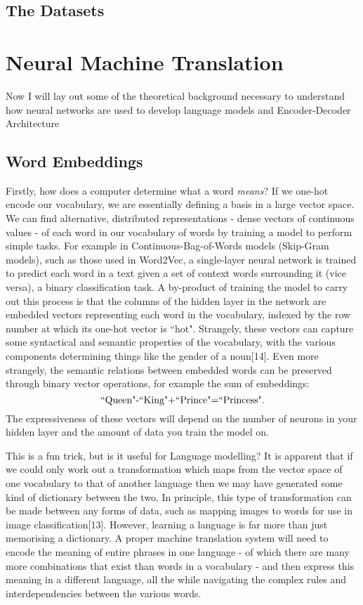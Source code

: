 \documentclass[]{article}
\begin{document}
\subsection{The Datasets} 
\section{Neural Machine Translation}
Now I will lay out some of the theoretical background necessary to understand how neural networks are used to develop language models and Encoder-Decoder Architecture 
\subsection{Word Embeddings}
Firstly, how does a computer determine what a word \textit{means}? If we one-hot encode our vocabulary, we are essentially defining a basis in a large vector space. We can find alternative, distributed representations - dense vectors of continuous values - of each word in our vocabulary of words by training a model to perform simple tasks. For example in Continuous-Bag-of-Words models (Skip-Gram models), such as those used in Word2Vec, a single-layer neural network is trained to predict each word in a text given a set of context words surrounding it (vice versa), a binary classification task.  A by-product of training the model to carry out this process is that the columns of the hidden layer in the network are embedded vectors representing each word in the vocabulary, indexed by the row number at which its one-hot vector is ``hot". Strangely, these vectors can capture some syntactical and semantic properties of the vocabulary, with the various components determining things like the gender of a noun[14]. Even more strangely, the semantic relations between embedded words can be preserved through binary vector operations, for example the sum of embeddings: \begin{equation}\textnormal{``Queen"-``King"+``Prince"=``Princess".}
\end{equation}
The expressiveness of these vectors will depend on the number of neurons in your hidden layer and the amount of data you train the model on.

This is a fun trick, but is it useful for Language modelling? It is apparent that if we could only work out a transformation which maps from the vector space of one vocabulary to that of another language then we may have generated some kind of dictionary between the two. In principle, this type of transformation can be made between any forms of data, such as mapping images to words for use in image classification[13]. However, learning a language is far more than just memorising a dictionary. A proper machine translation system will need to encode the meaning of entire phrases in one language - of which there are many more combinations that exist than words in a vocabulary - and then express this meaning in a different language, all the while navigating the complex rules and interdependencies between the various words.
\end{document}
